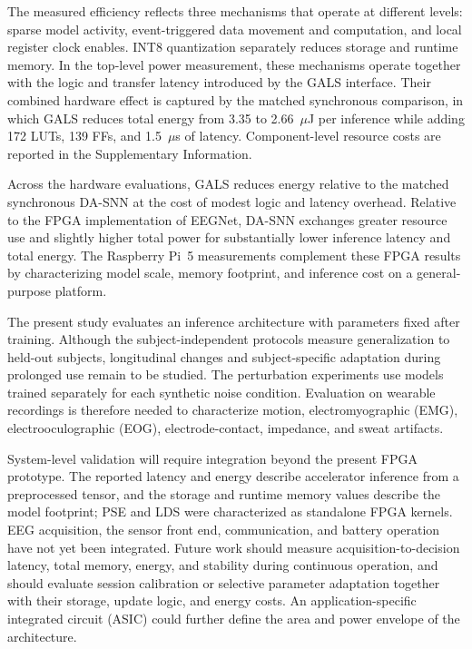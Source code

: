 \documentclass{nsr}
\begin{document}
The measured efficiency reflects three mechanisms that operate at different levels: sparse model activity, event-triggered data movement and computation, and local register clock enables. INT8 quantization separately reduces storage and runtime memory. In the top-level power measurement, these mechanisms operate together with the logic and transfer latency introduced by the GALS interface. Their combined hardware effect is captured by the matched synchronous comparison, in which GALS reduces total energy from 3.35 to 2.66~$\mu$J per inference while adding 172 LUTs, 139 FFs, and 1.5~$\mu$s of latency. Component-level resource costs are reported in the Supplementary Information.

Across the hardware evaluations, GALS reduces energy relative to the matched synchronous DA-SNN at the cost of modest logic and latency overhead. Relative to the FPGA implementation of EEGNet, DA-SNN exchanges greater resource use and slightly higher total power for substantially lower inference latency and total energy. The Raspberry Pi~5 measurements complement these FPGA results by characterizing model scale, memory footprint, and inference cost on a general-purpose platform.

The present study evaluates an inference architecture with parameters fixed after training. Although the subject-independent protocols measure generalization to held-out subjects, longitudinal changes and subject-specific adaptation during prolonged use remain to be studied. The perturbation experiments use models trained separately for each synthetic noise condition. Evaluation on wearable recordings is therefore needed to characterize motion, electromyographic (EMG), electrooculographic (EOG), electrode-contact, impedance, and sweat artifacts.

System-level validation will require integration beyond the present FPGA prototype. The reported latency and energy describe accelerator inference from a preprocessed tensor, and the storage and runtime memory values describe the model footprint; PSE and LDS were characterized as standalone FPGA kernels. EEG acquisition, the sensor front end, communication, and battery operation have not yet been integrated. Future work should measure acquisition-to-decision latency, total memory, energy, and stability during continuous operation, and should evaluate session calibration or selective parameter adaptation together with their storage, update logic, and energy costs. An application-specific integrated circuit (ASIC) could further define the area and power envelope of the architecture.
\end{document}
